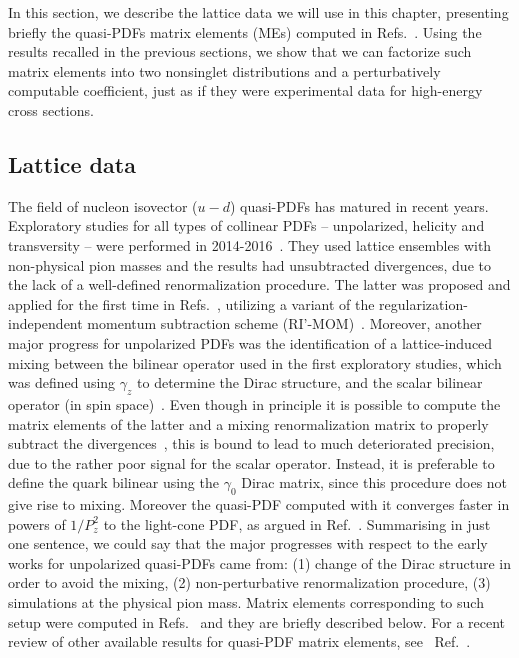 In this section, we describe the lattice data we will use in this chapter, presenting
briefly the quasi-PDFs matrix elements (MEs) computed in
Refs.~\cite{Alexandrou:2018pbm, Alexandrou:2019lfo}. Using the results recalled
in the previous sections, we show that we can factorize such matrix
elements into two nonsinglet distributions and a perturbatively computable
coefficient, just as if they were experimental data for high-energy cross
sections.

\subsection{Lattice data}
\label{subsec:latticedata}
The field of nucleon isovector ($u-d$) quasi-PDFs has matured in recent years.
Exploratory studies for all types of collinear PDFs -- unpolarized, helicity and
transversity -- were performed in
2014-2016~\cite{Lin:2014zya,Alexandrou:2015rja,Chen:2016utp,Alexandrou:2016jqi}.
They used lattice ensembles with non-physical pion masses and the results had
unsubtracted divergences, due to the lack of a well-defined renormalization
procedure. The latter was proposed and applied for the first time in
Refs.~\cite{Constantinou:2017sej,Alexandrou:2017huk}, utilizing a variant of the
regularization-independent momentum subtraction scheme
(RI'-MOM)~\cite{Martinelli:1994ty}. Moreover, another major progress for
unpolarized PDFs was the identification of a lattice-induced mixing between the
bilinear operator used in the first exploratory studies, which was defined using
$\gamma_z$ to determine the Dirac structure, and the scalar bilinear operator
(in spin space)~\cite{Constantinou:2017sej}. Even though in principle it is
possible to compute the matrix elements of the latter and a mixing
renormalization matrix to properly subtract the
divergences~\cite{Alexandrou:2017huk}, this is bound to lead to much
deteriorated precision, due to the rather poor signal for the scalar operator.
Instead, it is preferable to define the quark bilinear using the $\gamma_0$
Dirac matrix, since this procedure does not give rise to mixing. Moreover the
quasi-PDF computed with it converges faster in powers of $1/P_z^2$ to the
light-cone PDF, as argued in Ref.~\cite{Radyushkin:2016hsy}. Summarising in just
one sentence, we could say that the major progresses with respect to the early
works for unpolarized quasi-PDFs came from: (1) change of the Dirac structure in
order to avoid the mixing, (2) non-perturbative renormalization procedure, (3)
simulations at the physical pion mass. Matrix elements corresponding to such
setup were computed in Refs.~\cite{Alexandrou:2018pbm,Alexandrou:2019lfo,Chen:2018xof} and they are briefly
described below. For a recent review of other available results for quasi-PDF
matrix elements, see \eg\ Ref.~\cite{Cichy:2018mum}. 

